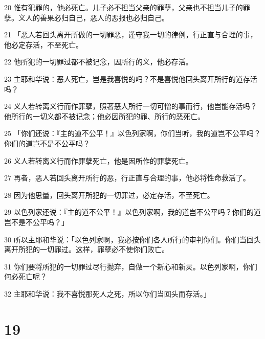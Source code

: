 \par 20 惟有犯罪的，他必死亡。儿子必不担当父亲的罪孽，父亲也不担当儿子的罪孽。义人的善果必归自己，恶人的恶报也必归自己。
\par 21 「恶人若回头离开所做的一切罪恶，谨守我一切的律例，行正直与合理的事，他必定存活，不至死亡。
\par 22 他所犯的一切罪过都不被记念，因所行的义，他必存活。
\par 23 主耶和华说：恶人死亡，岂是我喜悦的吗？不是喜悦他回头离开所行的道存活吗？
\par 24 义人若转离义行而作罪孽，照著恶人所行一切可憎的事而行，他岂能存活吗？他所行的一切义都不被记念；他必因所犯的罪、所行的恶死亡。
\par 25 「你们还说：『主的道不公平！』以色列家啊，你们当听，我的道岂不公平吗？你们的道岂不是不公平吗？
\par 26 义人若转离义行而作罪孽死亡，他是因所作的罪孽死亡。
\par 27 再者，恶人若回头离开所行的恶，行正直与合理的事，他必将性命救活了。
\par 28 因为他思量，回头离开所犯的一切罪过，必定存活，不至死亡。
\par 29 以色列家还说：『主的道不公平！』以色列家啊，我的道岂不公平吗？你们的道岂不是不公平吗？」
\par 30 所以主耶和华说：「以色列家啊，我必按你们各人所行的审判你们。你们当回头离开所犯的一切罪过。这样，罪孽必不使你们败亡。
\par 31 你们要将所犯的一切罪过尽行抛弃，自做一个新心和新灵。以色列家啊，你们何必死亡呢？
\par 32 主耶和华说：我不喜悦那死人之死，所以你们当回头而存活。」

\chapter{19}


